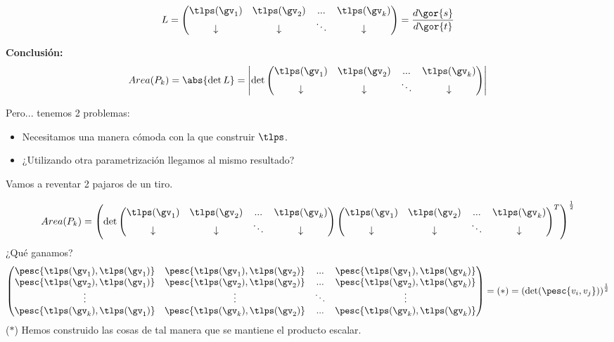 \begin{gather*}
L = \begin{pmatrix} \tlps(\gv_1) & \tlps(\gv_2) & ... & \tlps(\gv_k)\\
\downarrow & \downarrow & \ddots & \downarrow
\end{pmatrix} = \frac{d\gor{s}}{d\gor{t}}\end{gather*}

\textbf{Conclusión:} \[Area(P_k) = \abs{\det L} = \left|\det \begin{pmatrix}
\tlps(\gv_1) & \tlps(\gv_2) & ... & \tlps(\gv_k)\\
\downarrow & \downarrow & \ddots & \downarrow
\end{pmatrix}\right|\]

Pero... tenemos 2 problemas:
\begin{itemize}
\item Necesitamos una manera cómoda con la que construir $\tlps$.
\item ¿Utilizando otra parametrización llegamos al mismo resultado?
\end{itemize}

Vamos a reventar 2 pajaros de un tiro.

\[ Area(P_k) = \left( \det \begin{pmatrix}
\tlps(\gv_1) & \tlps(\gv_2) & ... & \tlps(\gv_k)\\
\downarrow & \downarrow & \ddots & \downarrow
\end{pmatrix} 
\begin{pmatrix}
\tlps(\gv_1) & \tlps(\gv_2) & ... & \tlps(\gv_k)\\
\downarrow & \downarrow & \ddots & \downarrow
\end{pmatrix} ^T \right)^{\frac{1}{2}}\]
¿Qué ganamos?
\[\begin{pmatrix}
\pesc{\tlps(\gv_1),\tlps(\gv_1)} & \pesc{\tlps(\gv_1),\tlps(\gv_2)} & ... & \pesc{\tlps(\gv_1),\tlps(\gv_k)}\\ 
\pesc{\tlps(\gv_2),\tlps(\gv_1)} & \pesc{\tlps(\gv_2),\tlps(\gv_2)} & ... & \pesc{\tlps(\gv_2),\tlps(\gv_k)}\\
\vdots & \vdots & \ddots & \vdots\\
\pesc{\tlps(\gv_k),\tlps(\gv_1)} & \pesc{\tlps(\gv_k),\tlps(\gv_2)} & ... & \pesc{\tlps(\gv_k),\tlps(\gv_k)}
\end{pmatrix} = (\ast) = \left(\det(\pesc{v_i,v_j})\right)^{\frac{1}{2}}\]
($\ast$) Hemos construido las cosas de tal manera que se mantiene el producto escalar.

